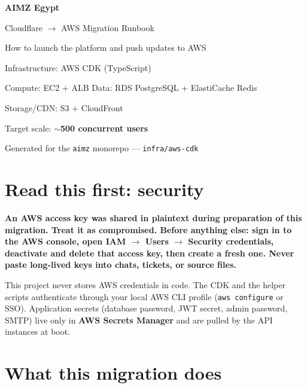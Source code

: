 \documentclass[11pt,a4paper]{article}
\newcommand{\warnbox}[1]{%
  \begingroup
  \setlength{\fboxsep}{8pt}%
  \noindent\colorbox{warnbg}{\parbox{\dimexpr\linewidth-2\fboxsep}{%
  \color{warnframe}\bfseries #1}}%
  \endgroup\par\vspace{6pt}
}
\begin{document}
\begin{titlepage}
\centering
\vspace*{3cm}
{\Huge\bfseries\color{aimzblue} AIMZ Egypt\par}
\vspace{0.6cm}
{\LARGE Cloudflare $\rightarrow$ AWS Migration Runbook\par}
\vspace{0.4cm}
{\large How to launch the platform and push updates to AWS\par}
\vspace{2cm}
{\large Infrastructure: AWS CDK (TypeScript)\par}
{\large Compute: EC2 + ALB \quad Data: RDS PostgreSQL + ElastiCache Redis\par}
{\large Storage/CDN: S3 + CloudFront\par}
\vfill
{\large Target scale: \textbf{$\sim$500 concurrent users}\par}
\vspace{0.5cm}
{\small Generated for the \texttt{aimz} monorepo --- \texttt{infra/aws-cdk}\par}
\end{titlepage}

\tableofcontents
\newpage

\section{Read this first: security}

\warnbox{An AWS access key was shared in plaintext during preparation of this
migration. Treat it as compromised. Before anything else: sign in to the AWS
console, open IAM $\rightarrow$ Users $\rightarrow$ Security credentials,
deactivate and delete that access key, then create a fresh one. Never paste
long-lived keys into chats, tickets, or source files.}

This project never stores AWS credentials in code. The CDK and the helper
scripts authenticate through your local AWS CLI profile
(\texttt{aws configure} or SSO). Application secrets (database password, JWT
secret, admin password, SMTP) live only in \textbf{AWS Secrets Manager} and are
pulled by the API instances at boot.

\section{What this migration does}
\end{document}
